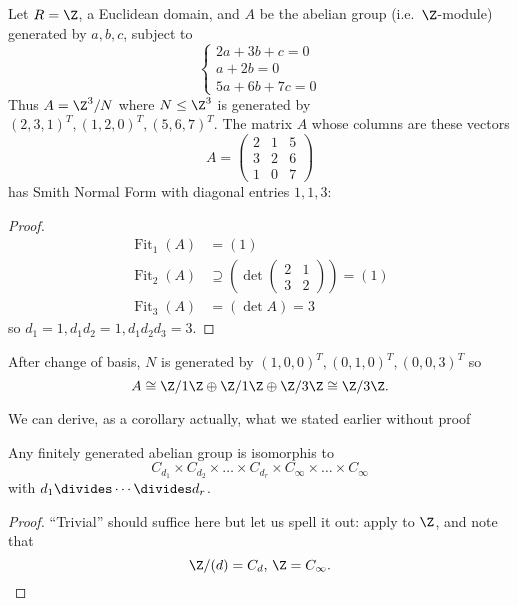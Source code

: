 \documentclass[a4paper]{article}
\theoremstyle{definition}
\DeclareMathOperator{\fit}{Fit}
\begin{document}
\begin{eg}
  Let \(R = \Z\), a Euclidean domain, and \(A\) be the abelian group (i.e.\ \(\Z\)-module) generated by \(a, b, c\), subject to
  \[
    \begin{cases}
      2a + 3b + c = 0 \\
      a + 2b = 0 \\
      5a + 6b + 7c = 0
    \end{cases}
  \]
  Thus \(A = \Z^3/N\) where \(N \leq \Z^3\) is generated by \((2, 3, 1)^T, (1, 2, 0)^T, (5, 6, 7)^T\). The matrix \(A\) whose columns are these vectors
  \[
    A =
    \begin{pmatrix}
      2 & 1 & 5 \\
      3 & 2 & 6 \\
      1 & 0 & 7
    \end{pmatrix}
  \]
  has Smith Normal Form with diagonal entries \(1, 1, 3\):

  \begin{proof}
    \begin{align*}
      \fit_1(A) &= (1) \\
      \fit_2(A) &\supseteq \left( \det
                  \begin{pmatrix}
                    2 & 1 \\
                    3 & 2
                  \end{pmatrix}
                        \right)
                        = (1) \\
      \fit_3(A) &= (\det A) = 3
    \end{align*}
    so \(d_1 = 1, d_1d_2 = 1, d_1d_2d_3 = 3\).
  \end{proof}

  After change of basis, \(N\) is generated by \((1, 0, 0)^T, (0, 1, 0)^T, (0, 0, 3)^T\) so
  \[
    A \cong \Z/1\Z \oplus \Z/1\Z \oplus \Z/3\Z \cong \Z/3\Z.
  \]
\end{eg}

We can derive, as a corollary actually, what we stated earlier without proof

\begin{theorem}
  Any finitely generated abelian group is isomorphis to
  \[
    C_{d_1} \times C_{d_2} \times \dots \times C_{d_r} \times C_\infty \times \dots \times C_\infty
  \]
  with \(d_1 \divides \cdots \divides d_r\).
\end{theorem}

\begin{proof}
  ``Trivial'' should suffice here but let us spell it out: apply  to \(\Z\), and note that
  \[
    \Z/(d) = C_d, \, \Z = C_\infty.
  \]
\end{proof}
\end{document}
